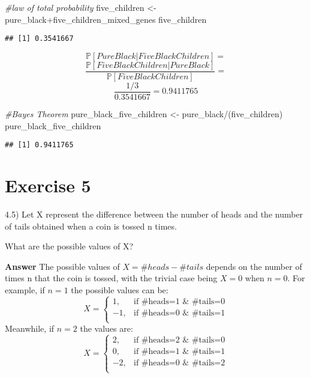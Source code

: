 \documentclass[
]{article}
\newenvironment{Shaded}{\begin{snugshade}}{\end{snugshade}}
\newcommand{\CommentTok}[1]{\textcolor[rgb]{0.56,0.35,0.01}{\textit{#1}}}
\newcommand{\NormalTok}[1]{#1}
\newcommand{\OtherTok}[1]{\textcolor[rgb]{0.56,0.35,0.01}{#1}}
\newcommand{\SpecialCharTok}[1]{\textcolor[rgb]{0.00,0.00,0.00}{#1}}
\begin{document}
\begin{Shaded}
\begin{Highlighting}[]
\CommentTok{\#law of total probability}
\NormalTok{five\_children }\OtherTok{\textless{}{-}}\NormalTok{ pure\_black}\SpecialCharTok{+}\NormalTok{five\_children\_mixed\_genes}
\NormalTok{five\_children}
\end{Highlighting}
\end{Shaded}

\begin{verbatim}
## [1] 0.3541667
\end{verbatim}

\[\mathbb P[PureBlack|FiveBlackChildren]=\]
\[\frac{\mathbb P[FiveBlackChildren|PureBlack]}{\mathbb P[FiveBlackChildren]}=\]
\[\frac{1/3}{0.3541667}=0.9411765\]

\begin{Shaded}
\begin{Highlighting}[]
\CommentTok{\#Bayes Theorem}
\NormalTok{pure\_black\_five\_children }\OtherTok{\textless{}{-}}\NormalTok{ pure\_black}\SpecialCharTok{/}\NormalTok{(five\_children)}
\NormalTok{pure\_black\_five\_children}
\end{Highlighting}
\end{Shaded}

\begin{verbatim}
## [1] 0.9411765
\end{verbatim}

\hypertarget{exercise-5}{%
\section{Exercise 5}\label{exercise-5}}

4.5) Let X represent the difference between the number of heads and the
number of tails obtained when a coin is tossed n times.

What are the possible values of X?

\textbf{Answer} The possible values of \(X=\# heads - \# tails\) depends
on the number of times n that the coin is tossed, with the trivial case
being \(X=0\) when \(n=0\). For example, if \(n=1\) the possible values
can be: \[
X = \begin{cases} 
1, & \mbox{if #heads=1 & #tails=0}\\
-1, & \mbox{if #heads=0 & #tails=1}\\
\end{cases}\] Meanwhile, if \(n=2\) the values are: \[
X = \begin{cases} 
2, & \mbox{if #heads=2 & #tails=0}\\
0, & \mbox{if #heads=1 & #tails=1}\\
-2, & \mbox{if #heads=0 & #tails=2}\\
\end{cases}\]
\end{document}
